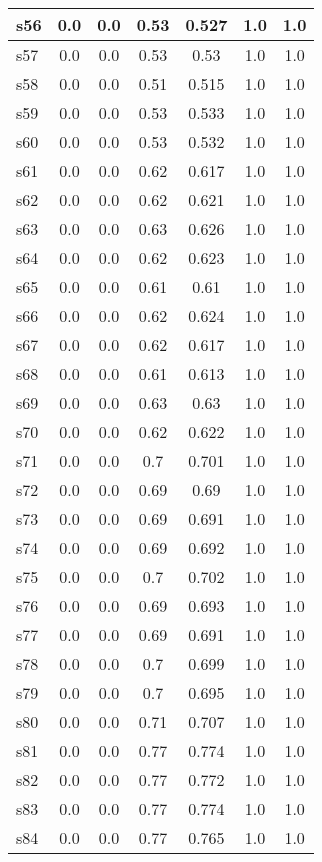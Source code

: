\documentclass{article}
\begin{document}
\begin{tabular}{|l|c|c|c|c|c|c|}
\hline
s56 &0.0 & 0.0 & 0.53 & 0.527 & 1.0 & 1.0\\
\hline
s57 &0.0 & 0.0 & 0.53 & 0.53 & 1.0 & 1.0\\
\hline
s58 &0.0 & 0.0 & 0.51 & 0.515 & 1.0 & 1.0\\
\hline
s59 &0.0 & 0.0 & 0.53 & 0.533 & 1.0 & 1.0\\
\hline
s60 &0.0 & 0.0 & 0.53 & 0.532 & 1.0 & 1.0\\
\hline
s61 &0.0 & 0.0 & 0.62 & 0.617 & 1.0 & 1.0\\
\hline
s62 &0.0 & 0.0 & 0.62 & 0.621 & 1.0 & 1.0\\
\hline
s63 &0.0 & 0.0 & 0.63 & 0.626 & 1.0 & 1.0\\
\hline
s64 &0.0 & 0.0 & 0.62 & 0.623 & 1.0 & 1.0\\
\hline
s65 &0.0 & 0.0 & 0.61 & 0.61 & 1.0 & 1.0\\
\hline
s66 &0.0 & 0.0 & 0.62 & 0.624 & 1.0 & 1.0\\
\hline
s67 &0.0 & 0.0 & 0.62 & 0.617 & 1.0 & 1.0\\
\hline
s68 &0.0 & 0.0 & 0.61 & 0.613 & 1.0 & 1.0\\
\hline
s69 &0.0 & 0.0 & 0.63 & 0.63 & 1.0 & 1.0\\
\hline
s70 &0.0 & 0.0 & 0.62 & 0.622 & 1.0 & 1.0\\
\hline
s71 &0.0 & 0.0 & 0.7 & 0.701 & 1.0 & 1.0\\
\hline
s72 &0.0 & 0.0 & 0.69 & 0.69 & 1.0 & 1.0\\
\hline
s73 &0.0 & 0.0 & 0.69 & 0.691 & 1.0 & 1.0\\
\hline
s74 &0.0 & 0.0 & 0.69 & 0.692 & 1.0 & 1.0\\
\hline
s75 &0.0 & 0.0 & 0.7 & 0.702 & 1.0 & 1.0\\
\hline
s76 &0.0 & 0.0 & 0.69 & 0.693 & 1.0 & 1.0\\
\hline
s77 &0.0 & 0.0 & 0.69 & 0.691 & 1.0 & 1.0\\
\hline
s78 &0.0 & 0.0 & 0.7 & 0.699 & 1.0 & 1.0\\
\hline
s79 &0.0 & 0.0 & 0.7 & 0.695 & 1.0 & 1.0\\
\hline
s80 &0.0 & 0.0 & 0.71 & 0.707 & 1.0 & 1.0\\
\hline
s81 &0.0 & 0.0 & 0.77 & 0.774 & 1.0 & 1.0\\
\hline
s82 &0.0 & 0.0 & 0.77 & 0.772 & 1.0 & 1.0\\
\hline
s83 &0.0 & 0.0 & 0.77 & 0.774 & 1.0 & 1.0\\
\hline
s84 &0.0 & 0.0 & 0.77 & 0.765 & 1.0 & 1.0\\

\end{tabular}
\end{document}
